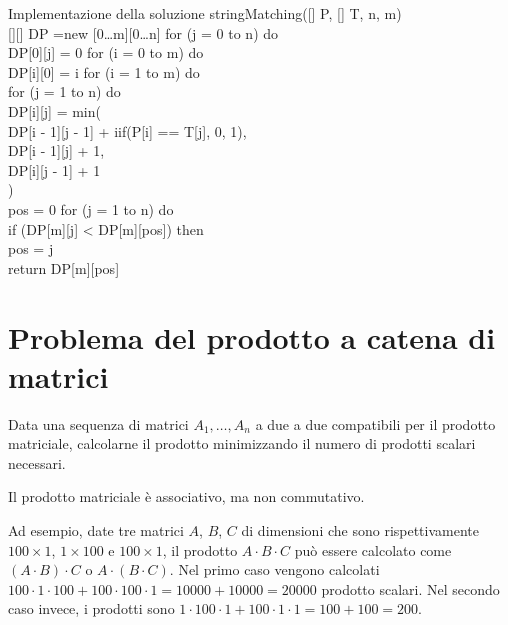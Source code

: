 \begin{minicode}{Implementazione della soluzione}
\ind{} stringMatching([] P, [] T,  n,  m)\\
    [][] DP =new [0\dots m][0\dots n]\hfill{}
    \indf for (j = 0 to n) do\\
        DP[0][j] = 0\hfill{}
    \indf for (i = 0 to m) do\\
        DP[i][0] = i\hfill{}
    \indf for (i = 1 to m) do\\
        \indff for (j = 1 to n) do\\
            DP[i][j] = min(\\
                \indffff DP[i - 1][j - 1] + iif(P[i] == T[j], 0, 1),\\
                \indffff DP[i - 1][j] + 1,\\
                \indffff DP[i][j - 1] + 1\\
            \indfff)\\
    \indf{} pos = 0\hfill{}
    \indf for (j = 1 to n) do\\
        \indff if (DP[m][j] < DP[m][pos]) then\\
            pos = j\\
    \indf return DP[m][pos]
\end{minicode}

\section{Problema del prodotto a catena di matrici}
\begin{problem}
     Data una sequenza di matrici $A_1,\dots,A_n$ a due a due compatibili per il
     prodotto matriciale, calcolarne il prodotto minimizzando il numero di
     prodotti scalari necessari.
\end{problem}
\begin{note}
    Il prodotto matriciale è associativo, ma non commutativo.
\end{note}\noindent
Ad esempio, date tre matrici $A$, $B$, $C$ di dimensioni che sono rispettivamente
$100\times 1$, $1\times 100$ e $100\times 1$, il prodotto $A\cdot B\cdot C$ può
essere calcolato come $(A\cdot B)\cdot C$ o $A\cdot(B\cdot C)$. Nel primo caso
vengono calcolati $100\cdot1\cdot100+100\cdot100\cdot 1=10000+10000=20000$
prodotto scalari. Nel secondo caso invece, i prodotti sono $1\cdot100\cdot1+100
\cdot1\cdot1=100+100=200$.

